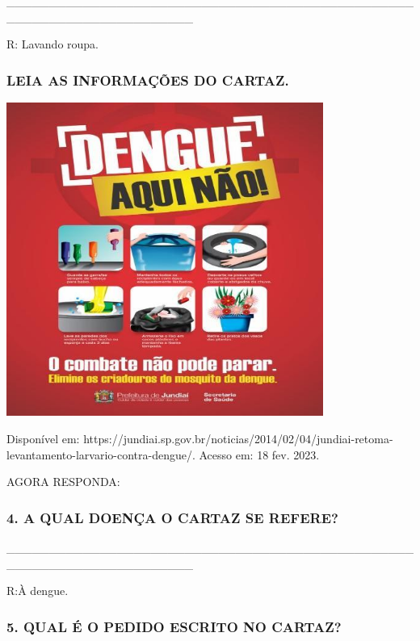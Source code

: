 \_\_\_\_\_\_\_\_\_\_\_\_\_\_\_\_\_\_\_\_\_\_\_\_\_\_\_\_\_\_\_\_\_\_\_\_\_\_\_\_\_\_\_\_\_\_\_\_\_\_\_\_\_\_\_\_\_\_\_\_\_\_\_\_\_\_\_\_\_\_

R: Lavando roupa.

\subsubsection{LEIA AS INFORMAÇÕES DO
CARTAZ.}\label{leia-as-informauxe7uxf5es-do-cartaz.}

\includegraphics[width=4.08681in,height=4.04722in]{media/image127.jpg}

Disponível em: https://jundiai.sp.gov.br/noticias/2014/02/04/jundiai-retoma-levantamento-larvario-contra-dengue/. Acesso em: 18 fev. 2023.

AGORA RESPONDA:

\subsubsection{4. A QUAL DOENÇA O CARTAZ SE REFERE?
}\label{qual-doenuxe7a-o-cartaz-se-refere}

\_\_\_\_\_\_\_\_\_\_\_\_\_\_\_\_\_\_\_\_\_\_\_\_\_\_\_\_\_\_\_\_\_\_\_\_\_\_\_\_\_\_\_\_\_\_\_\_\_\_\_\_\_\_\_\_\_\_\_\_\_\_\_\_\_\_\_\_\_\_

R:À dengue.

\subsubsection{5. QUAL É O PEDIDO ESCRITO NO CARTAZ?}\label{qual-pedido-vem-escrito-no-cartaz-para-acabar-com-a-dengue}

